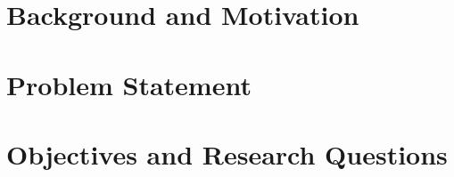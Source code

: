 \section{Background and Motivation}

\section{Problem Statement}

\section{Objectives and Research Questions}
